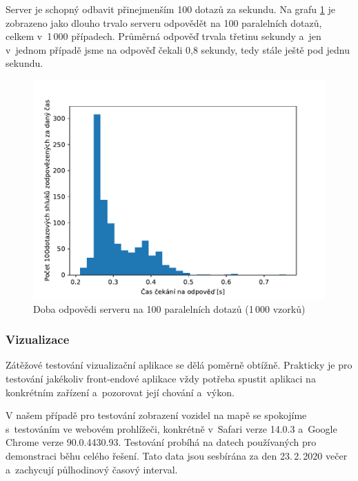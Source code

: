 \bigbreak

Server je schopný odbavit přinejmenším 100 dotazů za sekundu. Na grafu \ref{fig:server_response_time} je zobrazeno jako dlouho trvalo serveru odpovědět na 100 paralelních dotazů, celkem v~1\,000 případech. Průměrná odpověď trvala třetinu sekundy a~jen v~jednom případě jsme na odpověď čekali 0,8 sekundy, tedy stále ještě pod jednu sekundu.

\begin{figure}
   \centering
 \includegraphics[width=\linewidth]{../img/server_response_time}
 \caption{Doba odpovědi serveru na 100 paralelních dotazů (1\,000 vzorků)}
 \label{fig:server_response_time}
\end{figure}


\subsubsection{Vizualizace}

Zátěžové testování vizualizační aplikace se dělá poměrně obtížně. Prakticky je pro testování jakékoliv front-endové aplikace vždy potřeba spustit aplikaci na konkrétním zařízení a~pozorovat její chování a~výkon.


\bigbreak

V našem případě pro testování zobrazení vozidel na mapě se spokojíme s~testováním ve webovém prohlížeči, konkrétně v~Safari verze 14.0.3 a~Google Chrome verze 90.0.4430.93. Testování probíhá na datech používaných pro demonstraci běhu celého řešení. Tato data jsou sesbírána za den 23.\,2.\,2020 večer a~zachycují půlhodinový časový interval.


